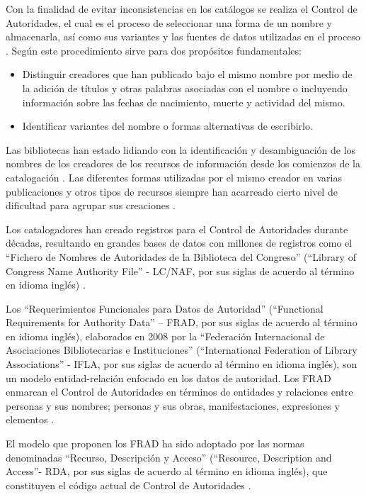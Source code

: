 Con la finalidad de evitar inconsistencias en los catálogos se realiza el Control de Autoridades, el cual es el proceso de seleccionar una forma de un nombre y almacenarla, así como sus variantes y las fuentes de datos utilizadas en el proceso \citep{Sandberg2016}. Según \cite{Carrasco2016} este procedimiento sirve para dos propósitos fundamentales:

\begin{itemize}
\item Distinguir creadores que han publicado bajo el mismo nombre por medio de la adición de títulos y otras palabras asociadas con el nombre o incluyendo información sobre las fechas de nacimiento, muerte y actividad del mismo.
\item Identificar variantes del nombre o formas alternativas de escribirlo.
\end{itemize}

Las bibliotecas han estado lidiando con la identificación y desambiguación de los nombres de los creadores de los recursos de información desde los comienzos de la catalogación \citep{Harper2007}. Las diferentes formas utilizadas por el mismo creador en varias publicaciones y otros tipos de recursos siempre han acarreado cierto nivel de dificultad para agrupar sus creaciones \citep{Harper2007}.

Los catalogadores han creado registros para el Control de Autoridades durante décadas, resultando en grandes bases de datos con millones de registros como el ``Fichero de Nombres de Autoridades de la Biblioteca del Congreso'' (``Library of Congress Name Authority File'' - LC/NAF, por sus siglas de acuerdo al término en idioma inglés) \citep{Sandberg2016}.

Los ``Requerimientos Funcionales para Datos de Autoridad'' (``Functional Requirements for Authority Data'' – FRAD, por sus siglas de acuerdo al término en idioma inglés), elaborados en 2008 por la ``Federación Internacional de Asociaciones Bibliotecarias e Instituciones'' (``International Federation of Library Associations'' - IFLA, por sus siglas de acuerdo al término en idioma inglés), son un modelo entidad-relación enfocado en los datos de autoridad. Los FRAD enmarcan el Control de Autoridades en términos de entidades y relaciones entre personas y sus nombres; personas y sus obras, manifestaciones, expresiones y elementos \citep{InternationalFederationofLibraryAssociationsandInstitutions2009,Sandberg2016}.

El modelo que proponen los FRAD ha sido adoptado por las normas denominadas ``Recurso, Descripción y Acceso'' (``Resource, Description and Access''- RDA, por sus siglas de acuerdo al término en idioma inglés), que constituyen el código actual de Control de Autoridades \citep{Sandberg2016}.

